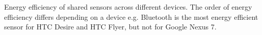 Energy efficiency of shared sensors across different devices. The order of energy efficiency differs depending on a device e.g. Bluetooth is the most energy efficient sensor for HTC Desire and HTC Flyer, but not for Google Nexus 7.  
